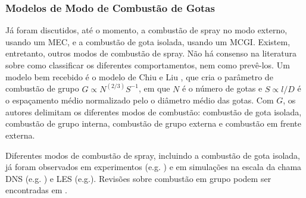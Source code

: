  



\subsubsection{Modelos de Modo de Combustão de Gotas}

Já foram discutidos, até o momento, a combustão de spray no modo externo, usando um MEC, e a combustão de gota isolada, usando um MCGI.
Existem, entretanto, outros modos de combustão de spray.
Não há consenso na literatura sobre como classificar os diferentes comportamentos, nem como prevê-los.
Um modelo bem recebido é o modelo de Chiu e Liu \cite{ChiuH1977,ChiuH1982}, que cria o parâmetro de combustão de grupo $G\propto N^{(2/3)} S^{-1}$, em que $N$ é o número de gotas e $S\propto l/D$ é o espaçamento médio normalizado pelo o diâmetro médio das gotas.
Com $G$, os autores delimitam os diferentes modos de combustão: combustão de gota isolada, combustão de grupo interna, combustão de grupo externa e combustão em frente externa.


Diferentes modos de combustão de spray, incluindo a combustão de gota isolada, já foram observados em experimentos (e.g. \cite{ChenG1996CF,CandelS1999,SinghG2020,ZhouH2024}) e em simulações na escala da chama DNS (e.g. \cite{BorghesiG2013CF}) e LES (e.g.\cite{PaulhiacD2020}).
Revisões sobre combustão em grupo podem ser encontradas em \cite{Annamalai1992,SirignanoW2014}.

